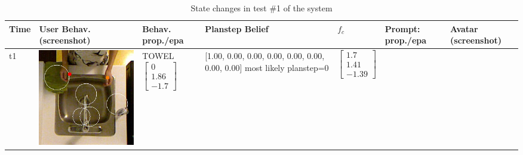 \begin{longtable}{| V{0.8cm} | V{2.6cm} | V{1.6cm} | V{2.1cm} | V{1.55cm} | V{1.6cm} | V{3.2cm} |}
\caption{State changes in test \#1 of the system}
\label{table:result-1}

\\ \hline

Time &
User Behav. (screenshot) &
Behav. prop./epa &
Planstep Belief &
$f_c$ &
Prompt: prop./epa &
Avatar (screenshot) \\ \hline
\endhead

t1 &
\includegraphics[width=\linewidth]{fig/system/_fast2-towel1_.jpg} &
TOWEL
\linebreak\linebreak
$\begin{bmatrix}
0 \\
1.86 \\
-1.7
\end{bmatrix}$ &
[1.00, 0.00, 0.00, 0.00, 0.00, 0.00, 0.00, 0.00] most likely planstep=0
&
$\begin{bmatrix}
1.7 \\
1.41 \\
-1.39
\end{bmatrix}$ &

\end{longtable}
